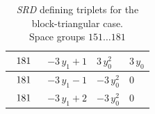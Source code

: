 \begin{table}[H]
\begin{center}
{\begin{tabular}{|l|l|l|l|}
$\begin{tabular}{l}
181 \\
\end{tabular}$ & $ -3 \, y_{1} + 1 $ & $ 3 \, y_{0}^{2} $ & $ 3 \, y_{0} $ \\ \hline
$\begin{tabular}{l}
181 \\
\end{tabular}$ & $ -3 \, y_{1} - 1 $ & $ -3 \, y_{0}^{2} $ & $ 0 $ \\ \hline
$\begin{tabular}{l}
181 \\
\end{tabular}$ & $ -3 \, y_{1} + 2 $ & $ -3 \, y_{0}^{2} $ & $ 0 $ \\ \hline
\end{tabular}
}
\captionsetup{justification=centering}
\caption{\textit{SRD} defining triplets for the block-triangular case. \\ Space groups $151\dots181 $}
\label{tab:case1_srdegrees204}
\end{center}
\end{table}

\newpage

